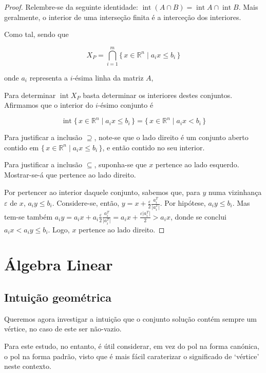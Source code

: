 \documentclass{article}
\DeclareMathOperator{\interior}{int}
\newcommand{\R}{\mathbb{R}}
\theoremstyle{definition}
\begin{document}
	\begin{proof}
	Relembre-se da seguinte identidade: $\interior (A \cap B) = \interior A \cap \interior B$. Mais geralmente, o interior de uma interseção finita é a interceção dos interiores.
	
	Como tal, sendo que
	
	\[X_P = \bigcap_{i=1}^m \{\,x \in \R^n \mid a_i x \leq b_i \,\}\]
	
	onde $a_i$ representa a $i$-ésima linha da matriz $A$,
	
	Para determinar $\interior X_P$ basta determinar os interiores destes conjuntos. Afirmamos que o interior do $i$-ésimo conjunto é
	
	\[\interior \{\,x \in \R^n \mid a_i x \leq b_i \,\} = \{\,x \in \R^n \mid a_i x < b_i \,\}\]
	
	Para justificar a inclusão $\supseteq$, note-se que o lado direito é um conjunto aberto contido em $\{\,x \in \R^n \mid a_i x \leq b_i \,\}$, e então contido no seu interior.
	
	Para justificar a inclusão $\subseteq$, suponha-se que $x$ pertence ao lado esquerdo. Mostrar-se-á que pertence ao lado direito.
	
	Por pertencer ao interior daquele conjunto, sabemos que, para $y$ numa vizinhança $\varepsilon$ de $x$, $a_i y \leq b_i$. Considere-se, então, $y = x + \frac \varepsilon 2 \frac{a_i^T}{\lvert a_i^T \rvert}$. Por hipótese, $a_i y \leq b_i$. Mas tem-se também $a_i y = a_i x + a_i \frac \varepsilon 2 \frac{a_i^T}{\lvert a_i^T \rvert} = a_i x + \frac {\varepsilon \lvert a_i^T \rvert} 2 > a_i x$, donde se conclui $a_i x < a_i y \leq b_i$. Logo, $x$ pertence ao lado direito.
	\end{proof}
	
	\section{Álgebra Linear}
	
	\subsection{Intuição geométrica}
	
	Queremos agora investigar a intuição que o conjunto solução contém sempre um vértice, no caso de este ser não-vazio.
	
	Para este estudo, no entanto, é útil considerar, em vez do pol na forma canónica, o pol na forma padrão, visto que é mais fácil caraterizar o significado de `vértice' neste contexto.
	
\end{document}
